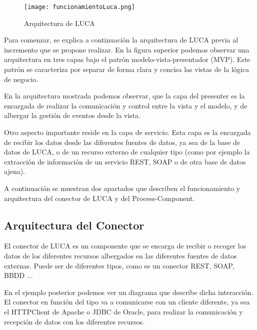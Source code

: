 \begin{figure}[H]
	\centering
	\texttt{[image: funcionamientoLuca.png]}
	\caption{Arquitectura de LUCA}\label{fig:funcionamientoLuca}
\end{figure}


Para comenzar, se explica a continuación la arquitectura de LUCA previa al incremento que se propone realizar.
En la figura superior podemos observar una arquitectura en tres capas bajo el patrón modelo-vista-presentador (MVP). Este patrón se caracteriza por separar de forma clara y concisa las vistas de la lógica de negocio.

\vspace{5mm}

En la arquitectura mostrada podemos observar, que la capa del presenter es la encargada de realizar la comunicación y control entre la vista y el modelo, y de albergar la gestión de eventos desde la vista.

\vspace{5mm}

Otro aspecto importante reside en la capa de servicio. Esta capa es la encargada de recibir los datos desde las diferentes fuentes de datos, ya sea de la base de datos de LUCA, o de un recurso externo de cualquier tipo (como por ejemplo la extracción de  información de un servicio REST, SOAP o de otra base de datos ajena).


\vspace{5mm}

A continuación se muestran dos apartados que describen el funcionamiento y arquitectura del conector de LUCA y del Process-Component.

\subsection{Arquitectura del Conector}


El conector de LUCA es un componente que se encarga de recibir o recoger los datos de los diferentes recursos albergados en las diferentes fuentes de datos externas. Puede ser de diferentes tipos, como es un conector REST, SOAP, BBDD ... 

\vspace{5mm}

En el ejemplo posterior podemos ver un diagrama que describe dicha interacción. El conector en función del tipo va a comunicarse con un cliente diferente, ya sea el HTTPClient \cite{httpclient} de Apache o JDBC \cite{jdbc} de Oracle, para realizar la comunicación y recepción de datos con los diferentes recursos.

